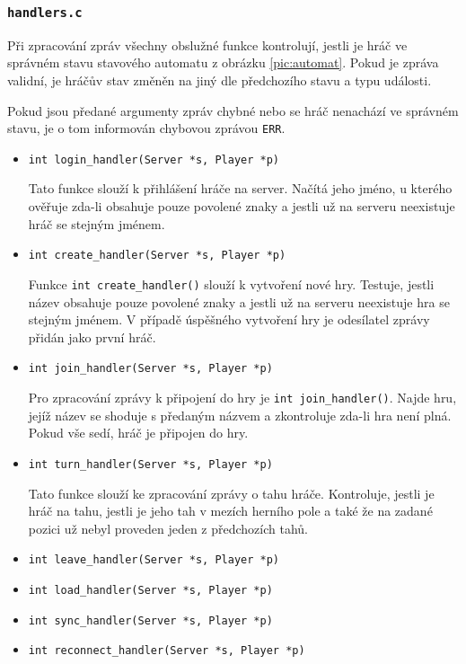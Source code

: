 \documentclass[11pt,a4paper]{article}
\begin{document}
\subsubsection{\texttt{handlers.c}}
Při zpracování zpráv všechny obslužné funkce kontrolují, jestli je hráč ve správném stavu stavového automatu z obrázku \ref{pic:automat}. Pokud je zpráva validní, je hráčův stav změněn na jiný dle předchozího stavu a typu události.

Pokud jsou předané argumenty zpráv chybné nebo se hráč nenachází ve správném stavu, je o tom informován chybovou zprávou \texttt{ERR}.

\begin{itemize}
	\item \texttt{int login\_handler(Server *s, Player *p)}

	Tato funkce slouží k přihlášení hráče na server. Načítá jeho jméno, u kterého ověřuje zda-li obsahuje pouze povolené znaky a jestli už na serveru neexistuje hráč se stejným jménem.
	\item \texttt{int create\_handler(Server *s, Player *p)}

	Funkce \texttt{int create\_handler()} slouží k vytvoření nové hry. Testuje, jestli název obsahuje pouze povolené znaky a jestli už na serveru neexistuje hra se stejným jménem. V případě úspěšného vytvoření hry je odesílatel zprávy přidán jako první hráč.

	\item \texttt{int join\_handler(Server *s, Player *p)}

	Pro zpracování zprávy k připojení do hry je \texttt{int join\_handler()}. Najde hru, jejíž název se shoduje s předaným názvem a zkontroluje zda-li hra není plná. Pokud vše sedí, hráč je připojen do hry.

	\item \texttt{int turn\_handler(Server *s, Player *p)}

	Tato funkce slouží ke zpracování zprávy o tahu hráče. Kontroluje, jestli je hráč na tahu, jestli je jeho tah v mezích herního pole a také že na zadané pozici už nebyl proveden jeden z předchozích tahů.
	\item \texttt{int leave\_handler(Server *s, Player *p)}
	\item \texttt{int load\_handler(Server *s, Player *p)}
	\item \texttt{int sync\_handler(Server *s, Player *p)}
	\item \texttt{int reconnect\_handler(Server *s, Player *p)}
\end{itemize}
\end{document}
